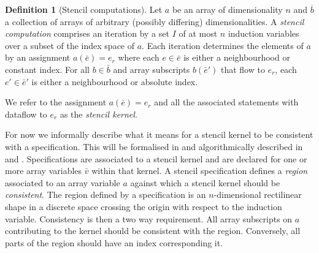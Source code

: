 \documentclass[10pt,preprint,numbers]{sigplanconf}
\newcommand{\dnote}[1]{\textcolor{darkpurple}{Dom: #1}}
\newcounter{block}
\theoremstyle{definition}
\newtheorem{definition}[block]{Definition}
\begin{document}
\begin{definition}[Stencil computations]
\label{def:stencil}
  Let $a$ be an array of dimensionality $n$ and $\overline{b}$ a
  collection of arrays of arbitrary (possibly differing)
  dimensionalities.
  A \emph{stencil computation} comprises an iteration by a set $I$ of at
  most $n$ induction variables
  over a subset of the index space of $a$. Each iteration
  determines the elements of $a$ by an
  assignment $a(\bar{e}) = e_r$ where each $e \in
  \bar{e}$ is either a neighbourhood or constant index.
  For all $b \in \bar{b}$ and array subscripts $b(\bar{e}')$
  that flow to $e_r$, each $e' \in \bar{e}'$ is
  either a neighbourhood or absolute index.

  We refer to the assignment $a(\bar{e}) = e_r$ and all the associated
  statements with dataflow to $e_r$ as the \emph{stencil kernel}.
\end{definition}
%
%

For now we informally describe what it means for a stencil kernel to
be consistent with a specification. This will be formalised in
 and algorithmically described in and
.  Specifications are associated to a stencil
kernel and are declared for one or more array variables $\bar{v}$
within that kernel.  A stencil specification defines a \emph{region}
associated to an array variable $a$ against which a stencil kernel
should be \emph{consistent}. The region defined by a specification is
an $n$-dimensional rectilinear shape in a discrete space crossing the
origin with respect to the induction variable. Consistency is then a
two way requirement. All array subscripts on $a$ contributing to the
kernel should be consistent with the region. Conversely, all parts of
the region should have an index corresponding it.
\end{document}
